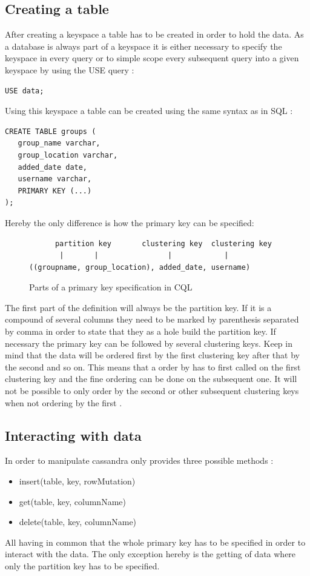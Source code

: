 \subsection{Creating a table}
After creating a keyspace a table has to be created in order to hold the data. As a database is always part of a keyspace it is either necessary to specify the keyspace in every query or to simple scope every subsequent query into a given keyspace by using the USE query \autocite{cassandra3cqldocUse}:
\begin{verbatim}
USE data;
\end{verbatim}

Using this keyspace a table can be created using the same syntax as in SQL \autocite{cqlAlexMeng, newInCQL3, cassandra3cqldocCreateTable}:
\begin{verbatim}
CREATE TABLE groups (
   group_name varchar,
   group_location varchar,
   added_date date,
   username varchar,
   PRIMARY KEY (...)
);
\end{verbatim}

Hereby the only difference is how the primary key can be specified:
\begin{figure}[ht]
    \centering
\begin{verbatim}
      partition key       clustering key  clustering key
       |       |                |            |
((groupname, group_location), added_date, username)
\end{verbatim}
    \caption{Parts of a primary key specification in CQL \autocite{cqlPrimaryKeyDefinition}}
    \label{fig:cassandra:primaryKeyDefinition}
\end{figure}
The first part of the definition will always be the partition key. If it is a compound of several columns they need to be marked by parenthesis separated by comma in order to state that they as a hole build the partition key. If necessary the primary key can be followed by several clustering keys. Keep in mind that the data will be ordered first by the first clustering key after that by the second and so on. This means that a order by has to first called on the first clustering key and the fine ordering can be done on the subsequent one. It will not be possible to only order by the second or other subsequent clustering keys when not ordering by the first \autocite{cqlPrimaryKeyDefinition, cassandra3cqldocCreateTable}.

\subsection{Interacting with data}
In order to manipulate cassandra only provides three possible methods \autocite{cassandra_paper}:
\begin{itemize}
    \item insert(table, key, rowMutation)
    \item get(table, key, columnName)
    \item delete(table, key, columnName)
\end{itemize}
All having in common that the whole primary key has to be specified in order to interact with the data. The only exception hereby is the getting of data where only the partition key has to be specified.

